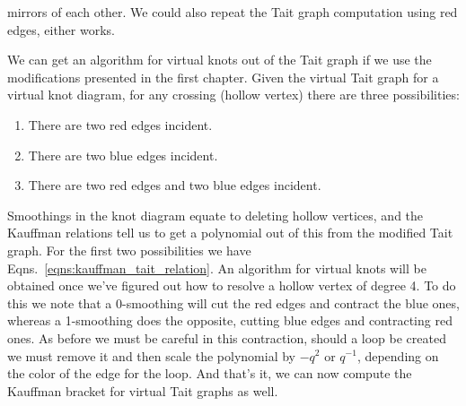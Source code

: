             mirrors of each other. We could also repeat the Tait graph
            computation using red edges, either works.
            \par\hfill\par
            We can get an algorithm for virtual knots out of the Tait graph
            if we use the modifications presented in the first chapter. Given
            the virtual Tait graph for a virtual knot diagram, for any
            crossing (hollow vertex) there are three possibilities:
            \begin{enumerate}
                \item There are two red edges incident.
                \item There are two blue edges incident.
                \item There are two red edges and two blue edges incident.
            \end{enumerate}
            Smoothings in the knot diagram equate to deleting hollow vertices,
            and the Kauffman relations tell us to get a polynomial out of this
            from the modified Tait graph. For the first two possibilities we
            have Eqns.~\ref{eqns:kauffman_tait_relation}. An algorithm for
            virtual knots will be obtained once we've figured out how to
            resolve a hollow vertex of degree 4. To do this we note that
            a 0-smoothing will cut the red edges and contract the blue ones,
            whereas a 1-smoothing does the opposite, cutting blue edges and
            contracting red ones. As before we must be careful in this
            contraction, should a loop be created we must remove it and then
            scale the polynomial by $-q^{2}$ or $q^{-1}$, depending on the
            color of the edge for the loop. And that's it, we can now compute
            the Kauffman bracket for virtual Tait graphs as well.
